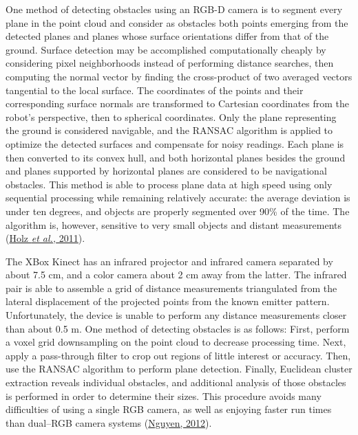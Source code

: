 \documentclass[12pt]{report}
\begin{document}
One method of detecting obstacles using an RGB-D camera is to segment every plane in the point cloud and consider as obstacles both points emerging from the detected planes and planes whose surface orientations differ from that of the ground.  Surface detection may be accomplished computationally cheaply by considering pixel neighborhoods instead of performing distance searches, then computing the normal vector by finding the cross-product of two averaged vectors tangential to the local surface.  The coordinates of the points and their corresponding surface normals are transformed to Cartesian coordinates from the robot's perspective, then to spherical coordinates.  Only the plane representing the ground is considered navigable, and the RANSAC algorithm is applied to optimize the detected surfaces and compensate for noisy readings.  Each plane is then converted to its convex hull, and both horizontal planes besides the ground and planes supported by horizontal planes are considered to be navigational obstacles.  This method is able to process plane data at high speed using only sequential processing while remaining relatively accurate: the average deviation is under ten degrees, and objects are properly segmented over 90\% of the time.  The algorithm is, however, sensitive to very small objects and distant measurements (\hyperref[bib:holz]{Holz \textit{et al.,} 2011}).

The XBox Kinect has an infrared projector and infrared camera separated by about 7.5 cm, and a color camera about 2 cm away from the latter.  The infrared pair is able to assemble a grid of distance measurements triangulated from the lateral displacement of the projected points from the known emitter pattern.  Unfortunately, the device is unable to perform any distance measurements closer than about 0.5 m.  One method of detecting obstacles is as follows:  First, perform a voxel grid downsampling on the point cloud to decrease processing time.  Next, apply a pass-through filter to crop out regions of little interest or accuracy.  Then, use the RANSAC algorithm to perform plane detection.  Finally, Euclidean cluster extraction reveals individual obstacles, and additional analysis of those obstacles is performed in order to determine their sizes.  This procedure avoids many difficulties of using a single RGB camera, as well as enjoying faster run times than dual--RGB camera systems (\hyperref[bib:nguyen]{Nguyen, 2012}).
\end{document}
